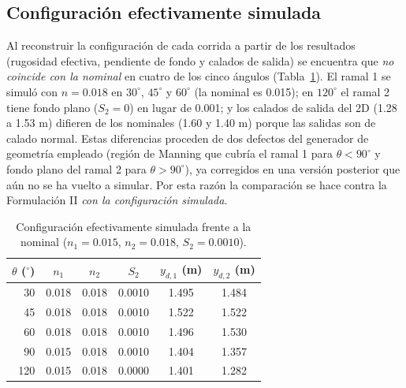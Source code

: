 \subsection{Configuración efectivamente simulada}\label{sec:config}
Al reconstruir la configuración de cada corrida a partir de los resultados (rugosidad efectiva, pendiente de fondo y calados de salida) se encuentra que \emph{no coincide con la nominal} en cuatro de los cinco ángulos (Tabla~\ref{tab:config}). El ramal 1 se simuló con $n=0.018$ en $30^\circ$, $45^\circ$ y $60^\circ$ (la nominal es 0.015); en $120^\circ$ el ramal 2 tiene fondo plano ($S_2=0$) en lugar de 0.001; y los calados de salida del 2D (1.28 a 1.53 m) difieren de los nominales (1.60 y 1.40 m) porque las salidas son de calado normal. Estas diferencias proceden de dos defectos del generador de geometría empleado (región de Manning que cubría el ramal 1 para $\theta<90^\circ$ y fondo plano del ramal 2 para $\theta>90^\circ$), ya corregidos en una versión posterior que aún no se ha vuelto a simular. Por esta razón la comparación se hace contra la Formulación II \emph{con la configuración simulada}.

\begin{table}[H]
\centering\small
\caption{Configuración efectivamente simulada frente a la nominal ($n_1=0.015$, $n_2=0.018$, $S_2=0.0010$).}\label{tab:config}
\begin{tabular}{rccccc}
\toprule
$\theta$ ($^\circ$) & $n_1$ & $n_2$ & $S_2$ & $y_{d,1}$ (m) & $y_{d,2}$ (m)\\\midrule
30 & 0.018 & 0.018 & 0.0010 & 1.495 & 1.484\\
45 & 0.018 & 0.018 & 0.0010 & 1.522 & 1.522\\
60 & 0.018 & 0.018 & 0.0010 & 1.496 & 1.530\\
90 & 0.015 & 0.018 & 0.0010 & 1.404 & 1.357\\
120 & 0.015 & 0.018 & 0.0000 & 1.401 & 1.282\\\bottomrule
\end{tabular}
\end{table}

